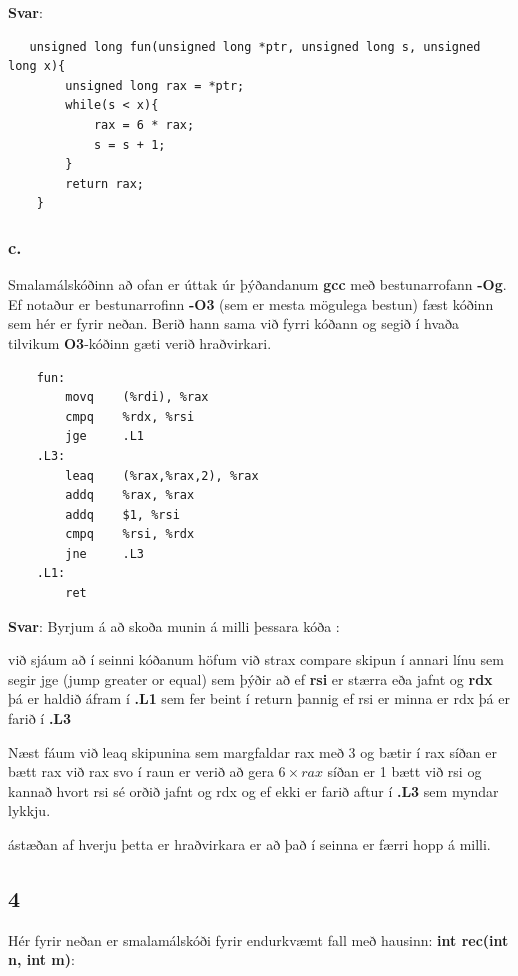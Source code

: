 \documentclass{article}
\begin{document}
\textbf{Svar}:

\begin{lstlisting}
   unsigned long fun(unsigned long *ptr, unsigned long s, unsigned long x){
        unsigned long rax = *ptr;
        while(s < x){
            rax = 6 * rax;
            s = s + 1;
        }
        return rax;
    }
\end{lstlisting}


\subsubsection{c.} Smalamálskóðinn að ofan er úttak úr þýðandanum \textbf{gcc} með bestunarrofann
\textbf{-Og}. Ef notaður er bestunarrofinn \textbf{-O3} (sem er mesta mögulega bestun) fæst
kóðinn sem hér er fyrir neðan. Berið hann sama við fyrri kóðann og segið í
hvaða tilvikum \textbf{O3}-kóðinn gæti verið hraðvirkari.

\begin{verbatim}
    fun:
        movq    (%rdi), %rax
        cmpq    %rdx, %rsi
        jge     .L1
    .L3:
        leaq    (%rax,%rax,2), %rax
        addq    %rax, %rax
        addq    $1, %rsi
        cmpq    %rsi, %rdx
        jne     .L3
    .L1:
        ret

\end{verbatim}

\textbf{Svar}:
Byrjum á að skoða munin á milli þessara kóða :

við sjáum að í seinni kóðanum höfum við 
strax compare skipun í annari línu sem segir jge (jump greater or equal) sem þýðir að ef \textbf{rsi} er stærra eða jafnt og \textbf{rdx} þá er haldið áfram í \textbf{.L1} sem fer beint í return
þannig ef rsi er minna er rdx þá er farið í \textbf{.L3}

Næst fáum við leaq skipunina sem margfaldar rax með 3 og bætir í rax síðan er bætt rax við rax svo í raun er verið að gera
$6 \times rax$ síðan er 1 bætt við rsi og kannað hvort rsi sé orðið jafnt og rdx og ef ekki er farið aftur í \textbf{.L3} sem myndar lykkju.

ástæðan af hverju þetta er hraðvirkara er að það í seinna er færri hopp á milli. 



\newpage

\subsection{4}
Hér fyrir neðan er smalamálskóði fyrir endurkvæmt fall með hausinn:
\textbf{int rec(int n, int m)}:
\end{document}
